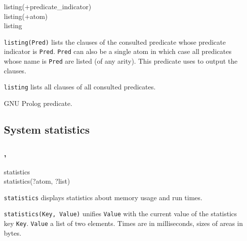 \begin{TemplatesOneCol}
listing(+predicate\_indicator)\\
listing(+atom)\\
listing

\end{TemplatesOneCol}

\Description

\texttt{listing(Pred)} lists the clauses of the consulted predicate whose
predicate indicator is \texttt{Pred}. \texttt{Pred} can also be a single
atom in which case all predicates whose name is \texttt{Pred} are listed (of
any arity). This predicate uses 
 to output the clauses.

\texttt{listing} lists all clauses of all consulted predicates.

\begin{PlErrors}



\end{PlErrors}

\Portability

GNU Prolog predicate.

\subsection{System statistics}

\subsubsection{,\label{statistics/2}
               }

\begin{TemplatesOneCol}
statistics\\
statistics(?atom, ?list)

\end{TemplatesOneCol}

\Description

\texttt{statistics} displays statistics about memory usage and run times.

\texttt{statistics(Key, Value)} unifies \texttt{Value} with the current
value of the statistics key \texttt{Key}. \texttt{Value} a list of two
elements. Times are in milliseconds, sizes of areas in bytes.

